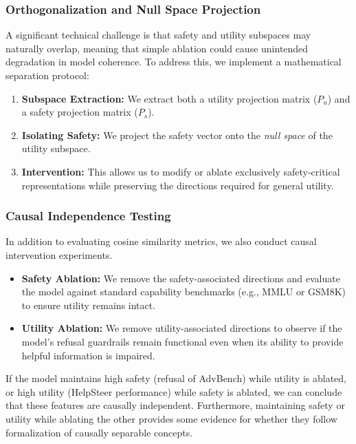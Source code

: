 \subsubsection{Orthogonalization and Null Space Projection}
A significant technical challenge is that safety and utility subspaces may naturally overlap, meaning that simple ablation could cause unintended degradation in model coherence. To address this, we implement a mathematical separation protocol:
\begin{enumerate}
    \item \textbf{Subspace Extraction:} We extract both a utility projection matrix ($P_{u}$) and a safety projection matrix ($P_{s}$).
    \item \textbf{Isolating Safety:} We project the safety vector onto the \textit{null space} of the utility subspace. 
    \item \textbf{Intervention:} This allows us to modify or ablate exclusively safety-critical representations while preserving the directions required for general utility.
\end{enumerate}



\subsubsection{Causal Independence Testing}
In addition to evaluating cosine similarity metrics, we also conduct causal intervention experiments. 
\begin{itemize}
    \item \textbf{Safety Ablation:} We remove the safety-associated directions and evaluate the model against standard capability benchmarks (e.g., MMLU or GSM8K) to ensure utility remains intact.
    \item \textbf{Utility Ablation:} We remove utility-associated directions to observe if the model's refusal guardrails remain functional even when its ability to provide helpful information is impaired.
\end{itemize}
If the model maintains high safety (refusal of AdvBench) while utility is ablated, or high utility (HelpSteer performance) while safety is ablated, we can conclude that these features are causally independent.
Furthermore, maintaining safety or utility while ablating the other provides some evidence for whether they follow \citet{park2023LRH} formalization of causally separable concepts.


